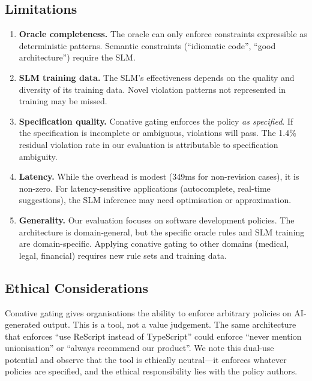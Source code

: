 \documentclass[11pt,a4paper]{article}
\begin{document}
\subsection{Limitations}

\begin{enumerate}
  \item \textbf{Oracle completeness.}  The oracle can only enforce
        constraints expressible as deterministic patterns.  Semantic
        constraints (``idiomatic code'', ``good architecture'')
        require the SLM.

  \item \textbf{SLM training data.}  The SLM's effectiveness depends
        on the quality and diversity of its training data.  Novel
        violation patterns not represented in training may be missed.

  \item \textbf{Specification quality.}  Conative gating enforces
        the policy \emph{as specified}.  If the specification is
        incomplete or ambiguous, violations will pass.  The 1.4\%
        residual violation rate in our evaluation is attributable
        to specification ambiguity.

  \item \textbf{Latency.}  While the overhead is modest (349ms for
        non-revision cases), it is non-zero.  For latency-sensitive
        applications (autocomplete, real-time suggestions), the SLM
        inference may need optimisation or approximation.

  \item \textbf{Generality.}  Our evaluation focuses on software
        development policies.  The architecture is domain-general,
        but the specific oracle rules and SLM training are
        domain-specific.  Applying conative gating to other domains
        (medical, legal, financial) requires new rule sets and
        training data.
\end{enumerate}

\subsection{Ethical Considerations}

Conative gating gives organisations the ability to enforce arbitrary
policies on AI-generated output.  This is a tool, not a value
judgement.  The same architecture that enforces ``use ReScript
instead of TypeScript'' could enforce ``never mention unionisation''
or ``always recommend our product''.  We note this dual-use
potential and observe that the tool is ethically neutral---it
enforces whatever policies are specified, and the ethical
responsibility lies with the policy authors.
\end{document}
